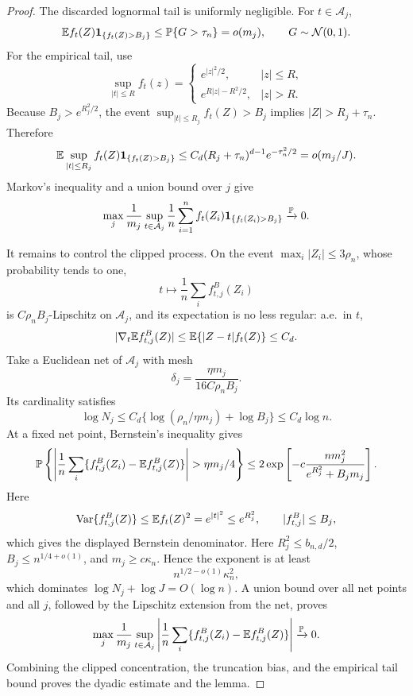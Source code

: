 \begin{proof}
The discarded lognormal tail is uniformly negligible.  For \(t\in
\mathcal A_j\),
\[
    \mathbb E f_t(Z)\mathbf 1_{\{f_t(Z)>B_j\}}
    \le \mathbb P\{G>\tau_n\}
    =o(m_j),\qquad G\sim\mathcal N(0,1).
\]
For the empirical tail, use
\[
    \sup_{|t|\le R}f_t(z)
    =
    \begin{cases}
        e^{|z|^2/2},& |z|\le R,\\
        e^{R|z|-R^2/2},& |z|>R.
    \end{cases}
\]
Because \(B_j>e^{R_j^2/2}\), the event
\(\sup_{|t|\le R_j}f_t(Z)>B_j\) implies \(|Z|>R_j+\tau_n\). Therefore
\[
    \mathbb E\sup_{|t|\le R_j}
    f_t(Z)\mathbf 1_{\{f_t(Z)>B_j\}}
    \le
    C_d(R_j+\tau_n)^{d-1}e^{-\tau_n^2/2}
    =o(m_j/J).
\]
Markov's inequality and a union bound over \(j\) give
\[
    \max_j\frac1{m_j}
    \sup_{t\in\mathcal A_j}
    \frac1n\sum_{i=1}^n
    f_t(Z_i)\mathbf 1_{\{f_t(Z_i)>B_j\}}
    \xrightarrow{\mathbb P}0 .
\]

It remains to control the clipped process.  On the event
\(\max_i|Z_i|\le3\rho_n\), whose probability tends to one,
\[
    t\mapsto \frac1n\sum_i f_{t,j}^B(Z_i)
\]
is \(C\rho_nB_j\)-Lipschitz on \(\mathcal A_j\), and its expectation is
no less regular: a.e.\ in \(t\),
\[
    |\nabla_t \mathbb E f_{t,j}^B(Z)|
    \le
    \mathbb E\{|Z-t|f_t(Z)\}
    \le C_d .
\]
Take a Euclidean net of \(\mathcal A_j\) with mesh
\[
    \delta_j=\frac{\eta m_j}{16C\rho_nB_j}.
\]
Its cardinality satisfies
\[
    \log N_j
    \le C_d\{\log(\rho_n/\eta m_j)+\log B_j\}
    \le C_d\log n.
\]
At a fixed net point, Bernstein's inequality gives
\[
    \Pbb\left\{
        \left|
        \frac1n\sum_i\{f_{t,j}^B(Z_i)-\E f_{t,j}^B(Z)\}
        \right|>\eta m_j/4
    \right\}
    \le
    2\exp\left[
        -c\frac{n m_j^2}{e^{R_j^2}+B_jm_j}
    \right].
\]
Here
\[
    \operatorname{Var}\{f_{t,j}^B(Z)\}
    \le
    \mathbb E f_t(Z)^2
    =
    e^{|t|^2}
    \le e^{R_j^2},
    \qquad
    |f_{t,j}^B|\le B_j,
\]
which gives the displayed Bernstein denominator.
Here \(R_j^2\le b_{n,d}/2\), \(B_j\le n^{1/4+o(1)}\), and
\(m_j\ge c\kappa_n\).  Hence the exponent is at least
\[
    n^{1/2-o(1)}\kappa_n^2,
\]
which dominates \(\log N_j+\log J=O(\log n)\).  A union bound over all
net points and all \(j\), followed by the Lipschitz extension from the
net, proves
\[
    \max_j\frac1{m_j}
    \sup_{t\in\mathcal A_j}
    \left|
        \frac1n\sum_i\{f_{t,j}^B(Z_i)-\mathbb E f_{t,j}^B(Z)\}
    \right|
    \xrightarrow{\mathbb P}0 .
\]
Combining the clipped concentration, the truncation bias, and the
empirical tail bound proves the dyadic estimate and the lemma.
\end{proof}

